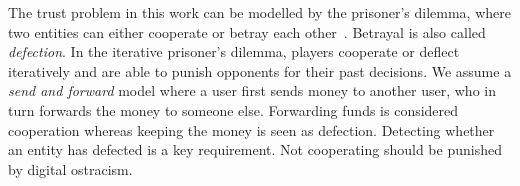 


The trust problem in this work can be modelled by the prisoner's dilemma, where two entities can either cooperate or betray each other~\cite{kreps1982rational}.
Betrayal is also called \emph{defection}.
In the iterative prisoner's dilemma, players cooperate or deflect iteratively and are able to punish opponents for their past decisions.
We assume a \emph{send and forward} model where a user first sends money to another user, who in turn forwards the money to someone else.
Forwarding funds is considered cooperation whereas keeping the money is seen as defection.
Detecting whether an entity has defected is a key requirement.
Not cooperating should be punished by digital ostracism.

